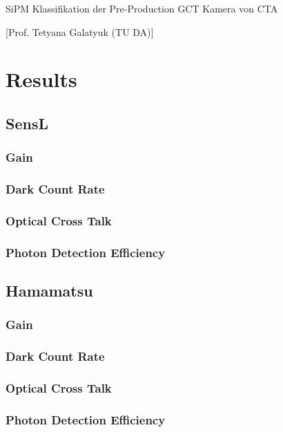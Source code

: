 \documentclass[article,type=pp,colorback,accentcolor=tud9c]{tudthesis}
\begin{document}
    {SiPM Klassifikation der Pre-Production GCT Kamera von CTA}
  \author{Ben Gebhardt}
  [Prof. Tetyana Galatyuk (TU DA)]
  \dateofexam{\today}{\today}
  \makethesistitle

  \section{Results}
     \subsection{SensL}
     \subsubsection{Gain}
     \subsubsection{Dark Count Rate}
     \subsubsection{Optical Cross Talk}
     \subsubsection{Photon Detection Efficiency}
     \subsection{Hamamatsu}
     \subsubsection{Gain}
     \subsubsection{Dark Count Rate}
     \subsubsection{Optical Cross Talk}
     \subsubsection{Photon Detection Efficiency}
\end{document}
